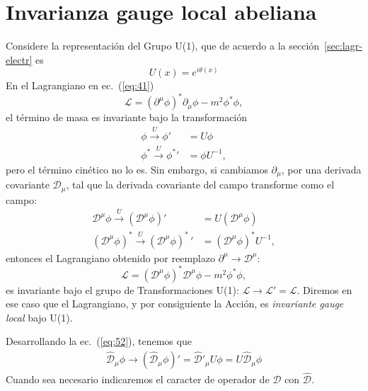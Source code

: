 \section{Invarianza gauge local abeliana}
\label{sec:invar-gauge-local}
Considere la representaci\'on del Grupo U(1), que de acuerdo a la secci\'on~\ref{sec:lagr-electr} es
\begin{equation}
  U(x)=e^{i\theta(x)}
\end{equation}
En el Lagrangiano en ec.~(\ref{eq:41})
\begin{equation}
  \mathcal{L}=\left(\partial^\mu\phi\right)^*\partial_\mu\phi-m^2\phi^*\phi,
\end{equation}
el t\'ermino de masa es invariante bajo la transformaci\'on
\begin{align}
\phi\overset{U}{\to}\phi'&=U\phi\nonumber\\
\label{eq:51}
\phi^*\overset{U}{\to}{\phi^*}'&=\phi U^{-1},
\end{align}
pero el t\'ermino cin\'etico no lo es. Sin embargo, si cambiamos $\partial_\mu$, por una derivada covariante $\mathcal{D}_\mu$, tal que la derivada covariante del campo transforme como el campo:
\begin{align}
\mathcal{D}^\mu\phi\overset{U}{\to}\left(\mathcal{D}^\mu\phi\right)'&=U\left(\mathcal{D}^\mu\phi\right)\nonumber\\
\label{eq:52}
\left(\mathcal{D}^\mu\phi\right)^*\overset{U}{\to}{\left(\mathcal{D}^\mu\phi\right)^*\,}'&=\left(\mathcal{D}^\mu\phi\right)^*U^{-1},
\end{align}
entonces el Lagrangiano obtenido por reemplazo $\partial^\mu\to\mathcal{D}^\mu$:
\begin{equation}
  \label{eq:53}
  \mathcal{L}=\left(\mathcal{D}^\mu\phi\right)^*\mathcal{D}^\mu\phi-m^2\phi^*\phi,
\end{equation}
es invariante bajo el grupo de Transformaciones U(1): $\mathcal{L}\to\mathcal{L}'=\mathcal{L}$. Diremos en ese caso que el Lagrangiano, y por consiguiente la Acci\'on, es \emph{invariante gauge local} bajo U(1). 

Desarrollando la ec.~(\ref{eq:52}), tenemos que
\begin{align}
  \label{eq:247}
  \widehat{\mathcal{D}}_\mu\phi\to{\left(\widehat{\mathcal{D}}_\mu\phi\right)}'=
  {{\widehat{\mathcal{D}}}'}_\mu U\phi=U\widehat{\mathcal{D}}_\mu\phi
\end{align}
Cuando sea necesario indicaremos el caracter de operador de $\mathcal{D}$ con $\widehat{\mathcal{D}}$.

